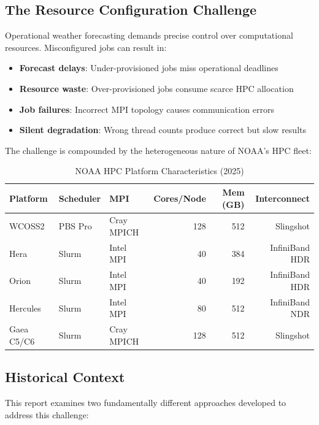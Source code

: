 \documentclass[11pt,twoside]{article}
\begin{document}
\subsection{The Resource Configuration Challenge}

Operational weather forecasting demands precise control over computational resources. Misconfigured jobs can result in:

\begin{itemize}[leftmargin=2em]
    \item \textbf{Forecast delays}: Under-provisioned jobs miss operational deadlines
    \item \textbf{Resource waste}: Over-provisioned jobs consume scarce HPC allocation
    \item \textbf{Job failures}: Incorrect MPI topology causes communication errors
    \item \textbf{Silent degradation}: Wrong thread counts produce correct but slow results
\end{itemize}

The challenge is compounded by the heterogeneous nature of NOAA's HPC fleet:

\begin{table}[H]
\centering
\caption{NOAA HPC Platform Characteristics (2025)}
\label{tab:platforms}
\begin{tabular}{@{}lllrrr@{}}
\toprule
\textbf{Platform} & \textbf{Scheduler} & \textbf{MPI} & \textbf{Cores/Node} & \textbf{Mem (GB)} & \textbf{Interconnect} \\
\midrule
WCOSS2 & PBS Pro & Cray MPICH & 128 & 512 & Slingshot \\
Hera & Slurm & Intel MPI & 40 & 384 & InfiniBand HDR \\
Orion & Slurm & Intel MPI & 40 & 192 & InfiniBand HDR \\
Hercules & Slurm & Intel MPI & 80 & 512 & InfiniBand NDR \\
Gaea C5/C6 & Slurm & Cray MPICH & 128 & 512 & Slingshot \\
\bottomrule
\end{tabular}
\end{table}

\subsection{Historical Context}

This report examines two fundamentally different approaches developed to address this challenge:
\end{document}
